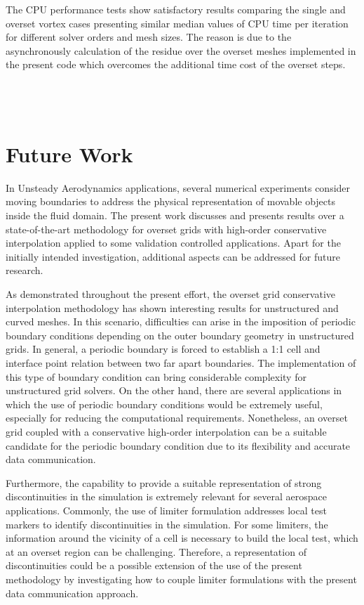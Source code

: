 The CPU performance tests show satisfactory results comparing the single and overset vortex cases presenting similar median values of CPU time per iteration for different solver orders and mesh sizes. The reason is due to the asynchronously calculation of the residue over the overset meshes implemented in the present code which overcomes the additional time cost of the overset steps.
\\
\\
\\
\\


\section{Future Work}
In Unsteady Aerodynamics applications, several numerical experiments consider moving boundaries to address the physical representation of movable objects inside the fluid domain. The present work discusses and presents results over a state-of-the-art methodology for overset grids with high-order conservative interpolation applied to some validation controlled applications. Apart for the initially intended investigation, additional aspects can be addressed for future research. 

As demonstrated throughout the present effort, the overset grid conservative interpolation methodology has shown interesting results for unstructured and curved meshes. In this scenario, difficulties can arise in the imposition of periodic boundary conditions depending on the outer boundary geometry in unstructured grids. In general, a periodic boundary is forced to establish a 1:1 cell and interface point relation between two far apart boundaries. The implementation of this type of boundary condition can bring considerable complexity for unstructured grid solvers. On the other hand, there are several applications in which the use of periodic boundary conditions would be extremely useful, especially for reducing the computational requirements. Nonetheless, an overset grid coupled with a conservative high-order interpolation can be a suitable candidate for the periodic boundary condition due to its flexibility and accurate data communication.

Furthermore, the capability to provide a suitable representation of strong discontinuities in the simulation is extremely relevant for several aerospace applications. Commonly, the use of limiter formulation addresses local test markers to identify discontinuities in the simulation. For some limiters, the information around the vicinity of a cell is necessary to build the local test, which at an overset region can be challenging. Therefore, a representation of discontinuities could be a possible extension of the use of the present methodology by investigating how to couple limiter formulations with the present data communication approach.